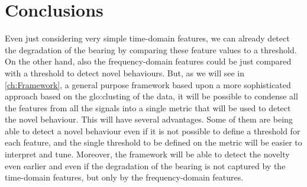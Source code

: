 \section{Conclusions}
Even just considering very simple time-domain features, we can already detect the degradation of the bearing by comparing these feature values to a threshold. On the other hand, also the frequency-domain features could be just compared with a threshold to detect novel behaviours. But, as we will see in \autoref{ch:Framework}, a general purpose framework based upon a more sophisticated approach based on the \gls{glo:clust}ing of the data, it will be possible to condense all the features from all the signals into a single metric that will be used to detect the novel behaviour. This will have several advantages. Some of them are being able to detect a novel behaviour even if it is not possible to define a threshold for each feature, and the single threshold to be defined on the metric will be easier to interpret and tune. Moreover, the framework will be able to detect the novelty even earlier and even if the degradation of the bearing is not captured by the time-domain features, but only by the frequency-domain features.

